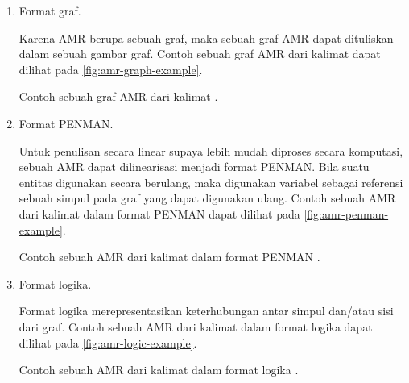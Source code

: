 \begin{enumerate}
  \item Format graf.

  Karena \gls{AMR} berupa sebuah graf, maka sebuah graf \gls{AMR} dapat dituliskan dalam sebuah gambar graf.
  Contoh sebuah graf \gls{AMR} dari kalimat  dapat dilihat pada \cref{fig:amr-graph-example}.

    {Contoh sebuah graf \gls{AMR} dari kalimat  .}

  \item Format PENMAN.

  Untuk penulisan secara linear supaya lebih mudah diproses secara komputasi, sebuah \gls{AMR} dapat dilinearisasi menjadi format PENMAN.
  Bila suatu entitas digunakan secara berulang, maka digunakan variabel sebagai referensi sebuah simpul pada graf yang dapat digunakan ulang.
  Contoh sebuah \gls{AMR} dari kalimat  dalam format PENMAN dapat dilihat pada \cref{fig:amr-penman-example}.

    {Contoh sebuah \gls{AMR} dari kalimat  dalam format PENMAN .}

  \item Format logika.

  Format logika merepresentasikan keterhubungan antar simpul dan/atau sisi dari graf.
  Contoh sebuah \gls{AMR} dari kalimat  dalam format logika dapat dilihat pada \cref{fig:amr-logic-example}.

    {Contoh sebuah \gls{AMR} dari kalimat  dalam format logika .}
\end{enumerate}
